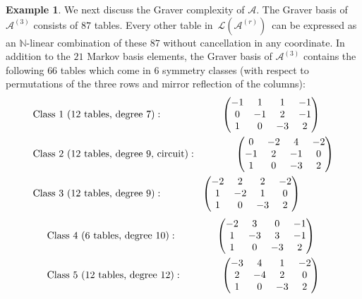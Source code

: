 \documentclass[11pt]{amsart}
\theoremstyle{definition}
\newtheorem{example}[theorem]{Example}
\newcommand{\naturals}{{\mathbb N}}
\renewcommand{\L}{{\mathcal L}}
\newcommand{\A}{{\mathcal A}}
\begin{document}
\begin{example}
We next discuss the Graver complexity of $\A$.
The Graver basis of $\A^{(3)}$ consists of $87$ tables.
Every other table in $ \, \L(\A^{(r)}) \,$ can be expressed as
an $\naturals$-linear combination of these $87$
without cancellation in any coordinate.
In addition to the $21$ Markov basis  elements,
the Graver basis of $\A^{(3)}$ contains the
following $66$ tables which come in $6$ symmetry classes
(with respect to permutations of the three rows and mirror
reflection of the columns):
\begin{eqnarray*} &
  \hbox{Class 1 ($12$ tables, degree $7$)}:\qquad\qquad\qquad
  \begin{pmatrix}
  -1 & 1 & 1 & -1 \\  0 & -1 & 2 & -1 \\  1 & 0 & -3 & 2 \\
  \end{pmatrix}
\\ &   \hbox{Class 2 ($12$ tables, degree $9$, circuit)}:\qquad\qquad
  \begin{pmatrix}
  0 & -2 & 4 & -2 \\  -1 & 2 & -1 & 0\\  1 & 0 & -3 & 2 \\
  \end{pmatrix} \\
  &
\hbox{Class 3 ($12$ tables, degree $9$)}: \qquad\qquad
  \begin{pmatrix}
  -2 & 2 & 2 & -2 \\  1 & -2 & 1 & 0 \\  1 & 0 & -3 & 2 \\
  \end{pmatrix}
\end{eqnarray*}
\begin{eqnarray*}
  &
  \hbox{Class 4 ($6$ tables, degree $10$)}: \qquad\qquad
  \begin{pmatrix}
  -2 & 3 & 0 & -1 \\  1 & -3 & 3 & -1 \\  1 & 0 & -3 & 2 \\
  \end{pmatrix}
\\ &
  \hbox{Class 5 ($12$ tables, degree $12$)}:\qquad\qquad
  \begin{pmatrix}
  -3 & 4 & 1 & -2 \\  2 & -4 & 2 & 0 \\  1 & 0 & -3 & 2 \\
  \end{pmatrix}
\\ &

\end{eqnarray*}
\end{example}
\end{document}
